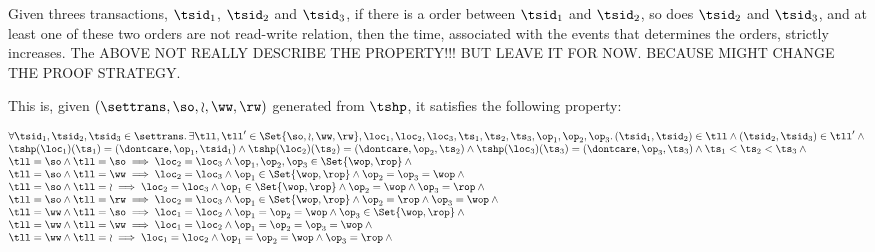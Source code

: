 \begin{lem}
    Given threes transactions, \( \tsid_{1} \), \( \tsid_{2} \) and \( \tsid_{3} \), if there is a order between \( \tsid_{1} \) and \( \tsid_{2} \), so does \( \tsid_{2} \) and \( \tsid_{3} \), and at least one of these two orders are not read-write relation, then the time, associated with the events that determines the orders, strictly increases.
    The ABOVE NOT REALLY DESCRIBE THE PROPERTY!!! BUT LEAVE IT FOR NOW. BECAUSE MIGHT CHANGE THE PROOF STRATEGY.

    This is, given \( (\settrans, \so, \wr, \ww, \rw) \) generated from \( \tshp \), it satisfies the following property:
     
    \[
        \begin{array}{@{}l@{}}
            \forall \tsid_{1}, \tsid_{2},\tsid_{3} \in \settrans \ldotp \exists \tll, \tll' \in \Set{\so, \wr, \ww, \rw}, \loc_{1}, \loc_{2}, \loc_{3}, \ts_{1}, \ts_{2}, \ts_{3}, \op_{1}, \op_{2}, \op_{3} \ldotp  (\tsid_{1}, \tsid_{2}) \in \tll \land (\tsid_{2}, \tsid_{3}) \in \tll' \land {} \\
            \tshp(\loc_{1})(\ts_{1}) = (\dontcare, \op_{1}, \tsid_{1}) \land \tshp(\loc_{2})(\ts_{2}) = (\dontcare, \op_{2}, \ts_{2}) \land \tshp(\loc_{3})(\ts_{3}) = (\dontcare, \op_{3}, \ts_{3}) \land \ts_{1} < \ts_{2} < \ts_{3} \land {} \\
            \tll = \so \land \tll = \so \implies \loc_{2} = \loc_{3} \land \op_{1}, \op_{2}, \op_{3} \in \Set{\wop, \rop} \land {} \\
            \tll = \so \land \tll = \ww \implies \loc_{2} = \loc_{3} \land \op_{1} \in \Set{\wop, \rop} \land \op_{2} = \op_{3} = \wop \land {} \\
            \tll = \so \land \tll = \wr \implies \loc_{2} = \loc_{3} \land \op_{1} \in \Set{\wop, \rop} \land \op_{2} = \wop \land \op_{3} = \rop \land {} \\
            \tll = \so \land \tll = \rw \implies \loc_{2} = \loc_{3} \land \op_{1} \in \Set{\wop, \rop} \land \op_{2} = \rop \land \op_{3} = \wop \land {} \\
            \tll = \ww \land \tll = \so \implies \loc_{1} = \loc_{2} \land \op_{1} = \op_{2} = \wop \land \op_{3} \in \Set{\wop, \rop} \land {} \\
            \tll = \ww \land \tll = \ww \implies \loc_{1} = \loc_{2} \land \op_{1} = \op_{2} = \op_{3} = \wop \land {} \\
            \tll = \ww \land \tll = \wr \implies \loc_{1} = \loc_{2} \land \op_{1} = \op_{2} = \wop \land \op_{3} = \rop \land {} \\

\end{array}\]
\end{lem}
